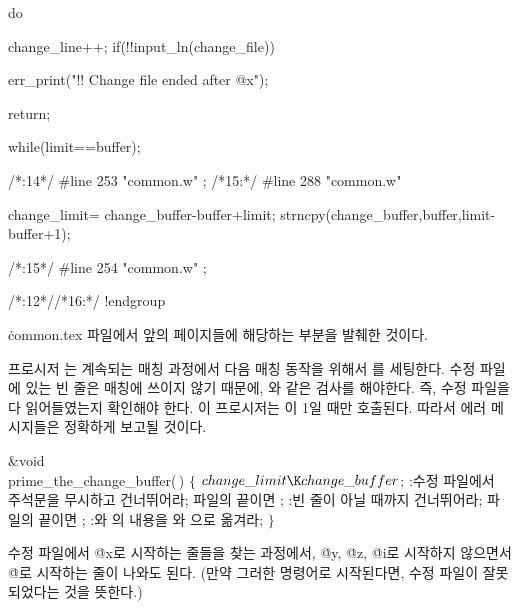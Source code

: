 {{do{
change_line++;
if(!!input_ln(change_file)){
err_print("!! Change file ended after @x");

return;
}
}while(limit==buffer);

/*:14*/
#line 253 "common.w"
;
/*15:*/
#line 288 "common.w"

{
change_limit= change_buffer-buffer+limit;
strncpy(change_buffer,buffer,limit-buffer+1);
}

/*:15*/
#line 254 "common.w"
;
}

/*:12*//*16:*/
!endgroup
\endgroup
\vfill\eject

\def\runninghead{\headlinefont 부록 
A --- {\tt CWEAVE}의 변환 결과 \TEX/ 코드}

\.{common.tex} 파일에서 앞의 페이지들에 해당하는 부분을 발췌한 것이다.

\vskip8pt
\begingroup \def\tt{\eighttt} \baselineskip9pt \hfontsize{8pt}
\verbatim
{}프로시저 는 계속되는 매칭 과정에서 다음 
매칭 동작을 위해서 를 세팅한다. 수정 파일에 있는 빈 줄은 매칭에
쓰이지 않기 때문에, 와 같은 검사를 해야한다. 즉, 수정 파일을 다 읽어들였는지 확인해야 한다. 
이 프로시저는 이 1일 때만 호출된다. 
따라서 에러 메시지들은 정확하게 보고될 것이다.

\Y\B\&{void} \\{prime\_the\_change\_buffer}(\,)\1\1\2\2\6
${}\{{}$\1\6
${}\\{change\_limit}\K\\{change\_buffer}{}$;\6
:수정 파일에서 주석문을 무시하고 건너뛰어라; 파일의 끝이면 \X;\6
:빈 줄이 아닐 때까지 건너뛰어라; 파일의 끝이면 \X;\6
:와 의 내용을 와 %
으로 옮겨라\X;\6
\4${}\}{}$\2\par
\fi

수정 파일에서 \.{@x}로 시작하는 줄들을 찾는 과정에서, \.{@y}, \.{@z}, \.{@i}로 
시작하지 않으면서 \.{@}로 시작하는 줄이 나와도 된다. (만약 그러한 명령어로 시작된다면, 
수정 파일이 잘못되었다는 것을 뜻한다.)

}
